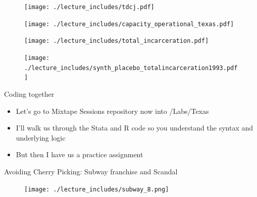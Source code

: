\documentclass{beamer}
\begin{document}
\begin{frame}[shrink=30,plain]

\begin{figure}
\texttt{[image: ./lecture\_includes/tdcj.pdf]}
\end{figure}
\end{frame}


\begin{frame}[shrink=30,plain]
\begin{figure}
\texttt{[image: ./lecture\_includes/capacity\_operational\_texas.pdf]}
\end{figure}
\end{frame}



\begin{frame}[shrink=30,plain]

\begin{figure}
\texttt{[image: ./lecture\_includes/total\_incarceration.pdf]}
\end{figure}
\end{frame}

\begin{frame}[shrink=30,plain]

\begin{figure}
\texttt{[image: ./lecture\_includes/synth\_placebo\_totalincarceration1993.pdf]}
\end{figure}
\end{frame}


\begin{frame}{Coding together}

\begin{itemize}
\item Let's go to Mixtape Sessions repository now into /Labs/Texas 
\item I'll walk us through the Stata and R code so you understand the syntax and underlying logic
\item But then I have us a practice assignment 
\end{itemize}

\end{frame}


\begin{frame}{Avoiding Cherry Picking: Subway franchise and Scandal}

	\begin{figure}
	\texttt{[image: ./lecture\_includes/subway\_8.png]}
	\end{figure}

\end{frame}
\end{document}
